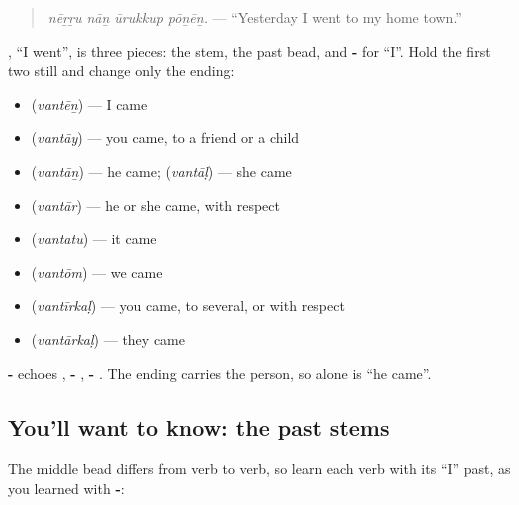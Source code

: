 \begin{quote}
\emph{nēṟṟu nāṉ ūrukkup pōṉēṉ.} — \textquotedblleft{}Yesterday I went to my home town.\textquotedblright{}
\end{quote}

\textbf{}, \textquotedblleft{}I went\textquotedblright{}, is three pieces: the stem, the past bead, and \textbf{-} for \textquotedblleft{}I\textquotedblright{}. Hold the first two still and change only the ending:

\begin{itemize}
\raggedright
  \item \textbf{} \textbf{} (\emph{vantēṉ}) — I came
  \item \textbf{} \textbf{} (\emph{vantāy}) — you came, to a friend or a child
  \item \textbf{} \textbf{} (\emph{vantāṉ}) — he came; \textbf{} \textbf{} (\emph{vantāḷ}) — she came
  \item \textbf{} \textbf{} (\emph{vantār}) — he or she came, with respect
  \item \textbf{} \textbf{} (\emph{vantatu}) — it came
  \item \textbf{} \textbf{} (\emph{vantōm}) — we came
  \item \textbf{} \textbf{} (\emph{vantīrkaḷ}) — you came, to several, or with respect
  \item \textbf{} \textbf{} (\emph{vantārkaḷ}) — they came
\end{itemize}

\textbf{-} echoes \textbf{}, \textbf{-} \textbf{}, \textbf{-} \textbf{}. The ending carries the person, so \textbf{} alone is \textquotedblleft{}he came\textquotedblright{}.

\subsection*{You'll want to know: the past stems}
The middle bead differs from verb to verb, so learn each verb with its \textquotedblleft{}I\textquotedblright{} past, as you learned \textbf{} with \textbf{-}:

